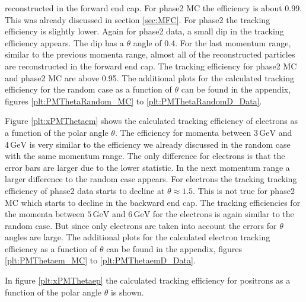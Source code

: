 \documentclass[a4paper,11pt,twosided,final,german,openbib,pdftex,listof=totoc,bibliography=totoc]{scrbook}
\begin{document}
reconstructed in the forward end cap. For phase2 MC the efficiency is about 0.99. This was already discussed in section \ref{sec:MFC}. For phase2 the tracking efficiency is slightly lower. Again for phase2 data, a small dip in the tracking efficiency appears. The dip has a $\theta$ angle of 0.4. For the last momentum range, similar to the previous momenta range, almost all of the reconstructed particles are reconstructed in the forward end cap. The tracking efficiency for phase2 MC and phase2 MC are above 0.95. The additional plots for the calculated tracking efficiency for the random case as a function of $\theta$ can be found in the appendix, figures \ref{plt:PMThetaRandom_MC} to \ref{plt:PMThetaRandomD_Data}.
 


Figure \ref{plt:xPMThetaem} shows the calculated tracking efficiency of electrons as a function of the polar angle $\theta$. The efficiency for momenta between $3\,\textrm{GeV}$ and $4\,\textrm{GeV}$ is very similar to the efficiency we already discussed in the random case with the same momentum range. The only difference for electrons is that the error bars are larger due to the lower statistic. In the next momentum range a larger difference to the random case appears. For electrons the tracking tracking efficiency of phase2 data starts to decline at $\theta \approx 1.5$. This is not true for phase2 MC which starts to decline in the backward end cap. The tracking efficiencies for the momenta between $5\,\textrm{GeV}$ and $6\,\textrm{GeV}$ for the electrons is again similar to the random case. But since only electrons are taken into account the errors for $\theta$ angles are large. The additional plots for the calculated electron tracking efficiency as a function of $\theta$ can be found in the appendix, figures \ref{plt:PMThetaem_MC} to \ref{plt:PMThetaemD_Data}.



In figure \ref{plt:xPMThetaep} the calculated tracking efficiency for positrons as a function of the polar angle $\theta$ is shown.
\end{document}
